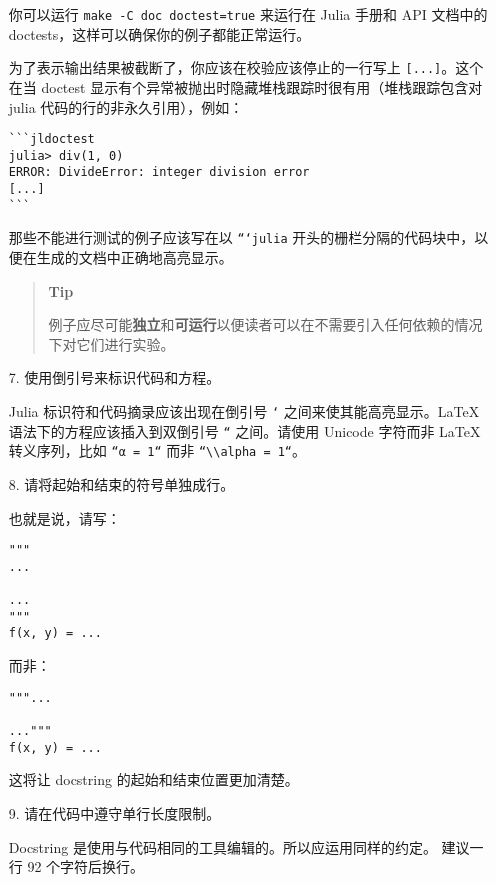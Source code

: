 \begin{itemize}
\begin{quote}
\end{quote}
你可以运行 \texttt{make -C doc doctest=true} 来运行在 Julia 手册和 API 文档中的 doctests，这样可以确保你的例子都能正常运行。

为了表示输出结果被截断了，你应该在校验应该停止的一行写上 \texttt{[...]}。这个在当 doctest 显示有个异常被抛出时隐藏堆栈跟踪时很有用（堆栈跟踪包含对 julia 代码的行的非永久引用），例如：


\begin{verbatim}
```jldoctest
julia> div(1, 0)
ERROR: DivideError: integer division error
[...]
```
\end{verbatim}

那些不能进行测试的例子应该写在以 \texttt{```julia} 开头的栅栏分隔的代码块中，以便在生成的文档中正确地高亮显示。

\begin{quote}
\textbf{Tip}

例子应尽可能\textbf{独立}和\textbf{可运行}以便读者可以在不需要引入任何依赖的情况下对它们进行实验。

\end{quote}

\item[7.  ] 使用倒引号来标识代码和方程。

Julia 标识符和代码摘录应该出现在倒引号 \texttt{`} 之间来使其能高亮显示。LaTeX 语法下的方程应该插入到双倒引号 \texttt{``} 之间。请使用 Unicode 字符而非 LaTeX 转义序列，比如 \texttt{``α = 1``} 而非 \texttt{``{\textbackslash}{\textbackslash}alpha = 1``}。


\item[8.  ] 请将起始和结束的\texttt{{\textquotedbl}{\textquotedbl}{\textquotedbl}}符号单独成行。

也就是说，请写：


\begin{verbatim}
"""
...

...
"""
f(x, y) = ...
\end{verbatim}

而非：


\begin{verbatim}
"""...

..."""
f(x, y) = ...
\end{verbatim}

这将让 docstring 的起始和结束位置更加清楚。


\item[9.  ] 请在代码中遵守单行长度限制。

Docstring 是使用与代码相同的工具编辑的。所以应运用同样的约定。 建议一行 92 个字符后换行。



\end{itemize}
